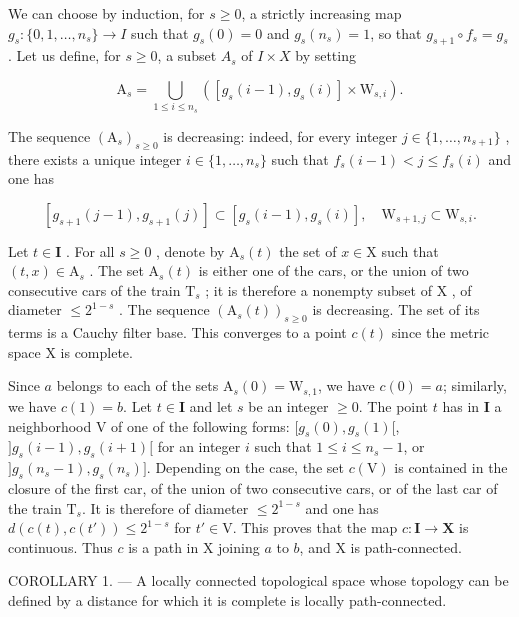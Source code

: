 We can choose by induction, for \(s \geqslant 0\), a strictly increasing map \(g_{s} \colon \{0,1,\ldots,n_{s}\} \to I\) such that \(g_{s}(0) = 0\) and \(g_{s}(n_{s}) = 1\), so that \(g_{s+1} \circ f_{s} = g_{s}\). Let us define, for \(s \geqslant 0\), a subset \(A_{s}\) of \(I \times X\) by setting

\[
\mathrm{A} _ {s} = \bigcup_ {1 \leqslant i \leqslant n _ {s}} ([ g _ {s} (i - 1), g _ {s} (i) ] \times \mathrm{W} _ {s, i}).
\]

The sequence \((\mathrm{A}_{s})_{s\geqslant0}\) is decreasing: indeed, for every integer \(j\in\{1,\ldots,n_{s+1}\}\) , there exists a unique integer \(i\in\{1,\ldots,n_{s}\}\) such that \(f_{s}(i-1)<j\leqslant f_{s}(i)\) and one has

\[
[ g _ {s + 1} (j - 1), g _ {s + 1} (j) ] \subset [ g _ {s} (i - 1), g _ {s} (i) ], \quad \mathrm{W} _ {s + 1, j} \subset \mathrm{W} _ {s, i}.
\]

Let \(t \in \mathbf{I}\) . For all \(s \geqslant 0\) , denote by \(\mathrm{A}_s(t)\) the set of \(x \in \mathrm{X}\) such that \((t, x) \in \mathrm{A}_s\) . The set \(\mathrm{A}_s(t)\) is either one of the cars, or the union of two consecutive cars of the train \(\mathrm{T}_s\) ; it is therefore a nonempty subset of \(\mathrm{X}\) , of diameter \(\leqslant 2^{1-s}\) . The sequence \((\mathrm{A}_s(t))_{s \geqslant 0}\) is decreasing. The set of its terms is a Cauchy filter base. This converges to a point \(c(t)\) since the metric space \(\mathrm{X}\) is complete.

Since \(a\) belongs to each of the sets \(\mathrm{A}_s(0) = \mathrm{W}_{s,1}\), we have \(c(0) = a\); similarly, we have \(c(1) = b\). Let \(t \in \mathbf{I}\) and let \(s\) be an integer \(\geqslant 0\). The point \(t\) has in \(\mathbf{I}\) a neighborhood V of one of the following forms: \([g_s(0), g_s(1)[\), \(]g_s(i - 1), g_s(i + 1)[\) for an integer \(i\) such that \(1 \leqslant i \leqslant n_s - 1\), or \(]g_s(n_s - 1), g_s(n_s)]\). Depending on the case, the set \(c(\mathrm{V})\) is contained in the closure of the first car, of the union of two consecutive cars, or of the last car of the train \(\mathrm{T}_s\). It is therefore of diameter \(\leqslant 2^{1-s}\) and one has \(d(c(t), c(t')) \leqslant 2^{1-s}\) for \(t' \in \mathrm{V}\). This proves that the map \(c\colon \mathbf{I} \to \mathbf{X}\) is continuous. Thus \(c\) is a path in X joining \(a\) to \(b\), and X is path-connected.

COROLLARY 1. --- A locally connected topological space whose topology can be defined by a distance for which it is complete is locally path-connected.

